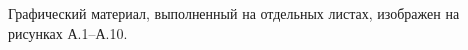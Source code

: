 
Графический материал, выполненный на отдельных листах,
изображен на рисунках А.1--А.10.

\renewcommand{\thefigure}{А.\arabic{figure}} %



